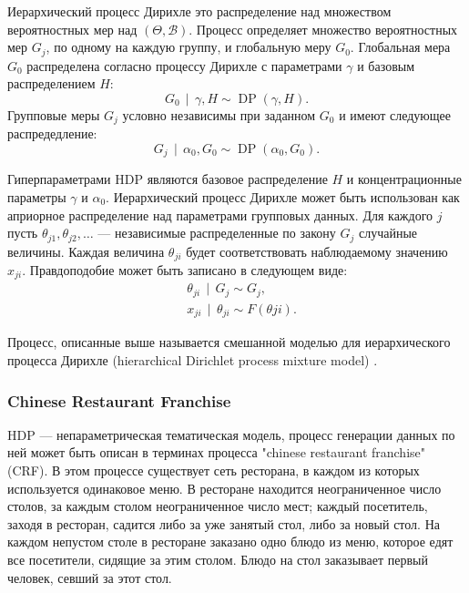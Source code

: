 \documentclass[12pt, a4paper]{article}
\newcommand\todo[1]{\marginpar{\textcolor{red}{#1}}}
\DeclareMathOperator{\DP}{DP}
\DeclareMathOperator{\svert}{\,\vert\,}
\begin{document}
  Иерархический процесс Дирихле это распределение над множеством вероятностных мер над $(\Theta, \mathcal{B})$. Процесс определяет множество вероятностных мер $G_j$, по одному на каждую группу, и глобальную меру $G_0$. Глобальная мера $G_0$ распределена согласно процессу Дирихле с параметрами $\gamma$ и базовым распределением $H$:
  \begin{equation}
  G_0 \svert \gamma, H \sim \DP(\gamma, H).
  \end{equation}
  Групповые меры $G_j$ условно независимы при заданном $G_0$ и имеют следующее распредедление:
  \begin{equation}
  G_j \svert \alpha_0, G_0 \sim \DP(\alpha_0, G_0).
  \end{equation}
  
  Гиперпараметрами HDP являются базовое распределение $H$ и концентрационные параметры $\gamma$ и $\alpha_0$.
  Иерархический процесс Дирихле может быть использован как априорное распределение над параметрами групповых данных. Для каждого $j$ пусть $\theta_{j1}, \theta_{j2}, \ldots$ --- независимые распределенные по закону $G_j$ случайные величины. Каждая величина $\theta_{ji}$ будет соответствовать наблюдаемому значению $x_{ji}$. Правдоподобие может быть записано в следующем виде:
  \begin{equation}
  \begin{aligned}
  & \theta_{ji} \svert G_j \sim G_j, \\
  & x_{ji} \svert \theta_{ji} \sim F(\theta{ji}).
  \end{aligned}
  \end{equation}
  
  Процесс, описанные выше называется смешанной моделью для иерархического процесса Дирихле (hierarchical Dirichlet process mixture model) \cite{hdp-1}.
  
  \subsubsection{Chinese Restaurant Franchise}

  
  HDP --- непараметрическая тематическая модель, процесс генерации данных по ней может быть описан в терминах процесса "chinese restaurant franchise" (CRF). В этом процессе существует сеть ресторана, в каждом из которых используется одинаковое меню. В ресторане находится неограниченное число столов, за каждым столом неограниченное число мест; каждый посетитель, заходя в ресторан, садится либо за уже занятый стол, либо за новый стол. На каждом непустом столе в ресторане заказано одно блюдо из меню, которое едят все посетители, сидящие за этим столом. Блюдо на стол заказывает первый человек, севший за этот стол.
  
\end{document}
